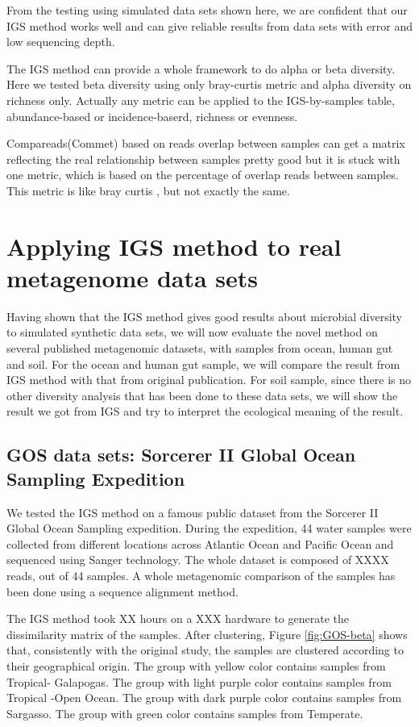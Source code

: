 \documentclass{article}
\begin{document}
From the testing using simulated data sets shown here, we are confident that our IGS method works well and can give reliable results from data sets with error and low sequencing depth.

The IGS method can provide a whole framework to do alpha or beta diversity. Here we tested beta diversity using only bray-curtis metric and alpha diversity on richness only. Actually any metric can be applied to the IGS-by-samples table, abundance-based or incidence-baserd, richness or evenness.

Compareads(Commet) based on reads overlap between samples can get a matrix reflecting the real relationship between samples pretty good but it is stuck with one metric, which is based on the percentage of overlap reads between samples. This metric is like bray curtis , but not exactly the same.



\section{Applying IGS method to real metagenome data sets}

Having shown that the IGS method gives good results about microbial diversity to simulated synthetic data sets, 
we will now evaluate the novel method on several published metagenomic datasets, with samples 
from ocean, human gut and soil. For the ocean and human gut sample, we will compare the result from IGS method
with that from original publication. For soil sample, since there is no other diversity analysis that has been done
to these data sets, we will show the result we got from IGS and try to interpret the ecological meaning of the result.


\subsection{GOS data sets: Sorcerer II Global Ocean Sampling Expedition}

We tested the IGS method on a famous public dataset from the Sorcerer II Global Ocean Sampling expedition.
During the expedition, 44 water samples were collected from different locations across
Atlantic Ocean and Pacific Ocean and sequenced using Sanger technology. The whole dataset is composed of XXXX reads, out of 44 samples.
A whole metagenomic comparison of the samples has been done
using a sequence alignment method. 

The IGS method took XX hours on a XXX hardware to generate the dissimilarity matrix of the samples. After clustering, 
Figure \ref{fig:GOS-beta} shows that, consistently with the original study, the samples are clustered according to their 
geographical origin. The group with yellow color contains samples from Tropical- Galapogas. The group with light purple color
contains samples from Tropical -Open Ocean. The group with dark purple color contains samples from Sargasso. The group 
with green color contains samples from Temperate. 
\end{document}
